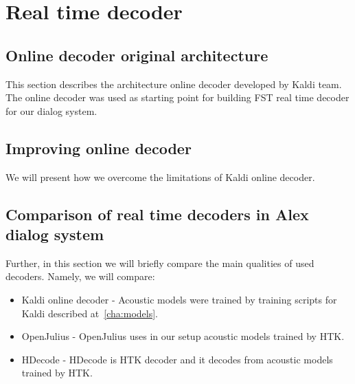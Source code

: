 \chapter{Real time decoder}
\label{cha:decoder}



\section{Online decoder original architecture} 
\label{sec:kaldi_decoder_architecture}
This section describes the architecture online decoder developed by Kaldi team.
The online decoder was used as starting point for building \ac{FST} real time decoder for our dialog system.


\section{Improving online decoder} 
\label{sec:improve}
We will present how we overcome the limitations of Kaldi online decoder.



\section[Comparison of real time decoders]{Comparison of real time decoders in Alex dialog system} 
\label{sec:comparison_of_real_time_decoders_in_alex_dialog_system}
Further, in this section we will briefly compare the main qualities of used decoders.
Namely, we will compare: 
\begin{itemize}
    \item Kaldi online decoder - Acoustic models were trained by training scripts for Kaldi described at~\ref{cha:models}.
    \item OpenJulius - OpenJulius uses in our setup acoustic models trained by \ac{HTK}. 
    \item HDecode - HDecode is \ac{HTK} decoder and it decodes from acoustic models trained by \ac{HTK}.
\end{itemize}


